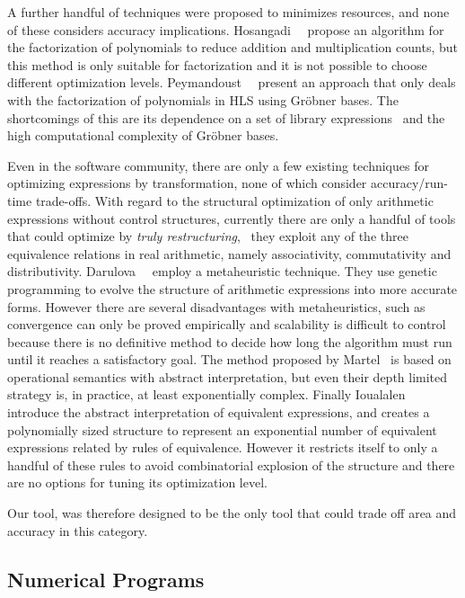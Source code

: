 A further handful of techniques were proposed to minimizes resources, and none
of these considers accuracy implications.  Hosangadi~\etal~\cite{hosangadi}
propose an algorithm for the factorization of polynomials to reduce
addition and multiplication counts, but this method is only suitable for
factorization and it is not possible to choose different optimization
levels. Peymandoust~\etal~\cite{peymandoust} present an approach that
only deals with the factorization of polynomials in HLS using Gr\"obner
bases. The shortcomings of this are its dependence on a set of library
expressions~\cite{hosangadi} and the high computational complexity of Gr\"obner
bases.

Even in the software community, there are only a few existing techniques
for optimizing expressions by transformation, none of which consider
accuracy/run-time trade-offs.  With regard to the structural optimization
of only arithmetic expressions without control structures, currently
there are only a handful of tools that could optimize by \emph{truly
restructuring}, \ie~they exploit any of the three equivalence relations in
real arithmetic, namely associativity, commutativity and distributivity.
Darulova~\etal~\cite{darulova} employ a metaheuristic technique. They use
genetic programming to evolve the structure of arithmetic expressions into more
accurate forms. However there are several disadvantages with metaheuristics,
such as convergence can only be proved empirically and scalability is difficult
to control because there is no definitive method to decide how long the
algorithm must run until it reaches a satisfactory goal. The method proposed
by Martel~\cite{martel07} is based on operational semantics with abstract
interpretation, but even their depth limited strategy is, in practice, at least
exponentially complex.  Finally Ioualalen~\etal~\cite{ioualalen} introduce the
abstract interpretation of equivalent expressions, and creates a polynomially
sized structure to represent an exponential number of equivalent expressions
related by rules of equivalence. However it restricts itself to only a handful
of these rules to avoid combinatorial explosion of the structure and there are
no options for tuning its optimization level.

Our tool, \soap{} was therefore designed to be the only tool that could trade
off area and accuracy in this category.


\subsection{Numerical Programs}
\label{bg:sub:numerical_programs}

